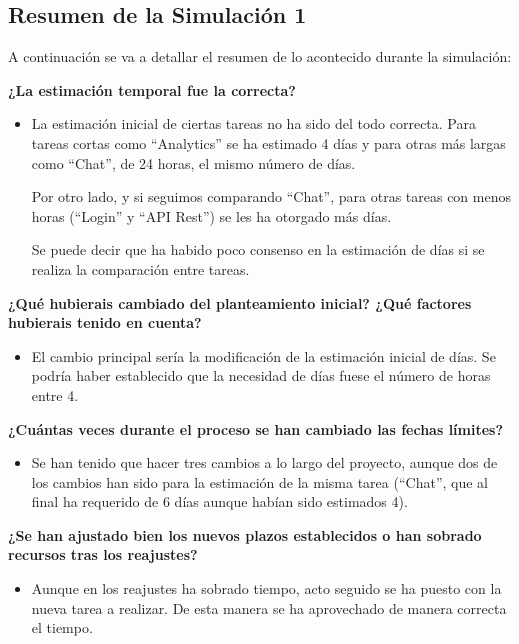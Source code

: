 \documentclass{\ClassPath/viu-tfm-template}
\begin{document}
\subsection{Resumen de la Simulación 1}
A continuación se va a detallar el resumen de lo acontecido durante la simulación:

\textbf{¿La estimación temporal fue la correcta?}
\vspace{-12pt}
\begin{itemize}
    \item La estimación inicial de ciertas tareas no ha sido del todo correcta. Para tareas cortas como “Analytics” se ha estimado 4 días y para otras más largas como “Chat”, de 24 horas, el mismo número de días.

    Por otro lado, y si seguimos comparando “Chat”, para otras tareas con menos horas (“Login” y “API Rest”) se les ha otorgado más días.

    Se puede decir que ha habido poco consenso en la estimación de días si se realiza la comparación entre tareas.
\end{itemize}

\textbf{¿Qué hubierais cambiado del planteamiento inicial? ¿Qué factores hubierais tenido en cuenta?}
\vspace{-12pt}
\begin{itemize}
    \item El cambio principal sería la modificación de la estimación inicial de días. Se podría haber establecido que la necesidad de días fuese el número de horas entre 4.
\end{itemize}

\textbf{¿Cuántas veces durante el proceso se han cambiado las fechas límites?}
\vspace{-12pt}
\begin{itemize}
    \item Se han tenido que hacer tres cambios a lo largo del proyecto, aunque dos de los cambios han sido para la estimación de la misma tarea (“Chat”, que al final ha requerido de 6 días aunque habían sido estimados 4).
\end{itemize}


\textbf{¿Se han ajustado bien los nuevos plazos establecidos o han sobrado recursos tras los reajustes?}
\vspace{-12pt}
\begin{itemize}
    \item Aunque en los reajustes ha sobrado tiempo, acto seguido se ha puesto con la nueva tarea a realizar. De esta manera se ha aprovechado de manera correcta el tiempo.
\end{itemize}
\end{document}
